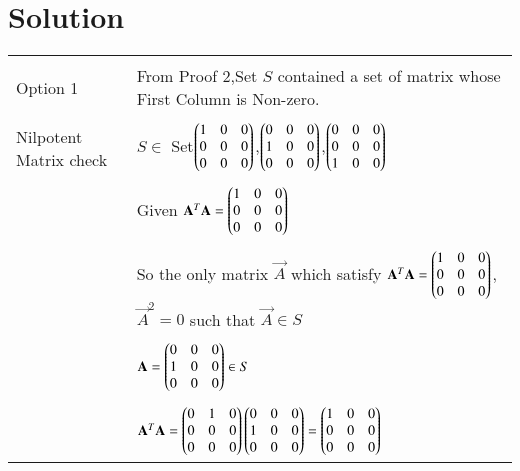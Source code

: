 \documentclass[journal,12pt]{IEEEtran}
\begin{document}
\section{\textbf{Solution}}
\renewcommand{\thetable}{2}
\begin{longtable}{|l|l|}
	\hline
	\multirow{3}{*}{Option 1} & \\
	&From Proof 2,Set $S$ contained a set of matrix whose First Column is Non-zero. \\ 
    & \\
    Nilpotent Matrix check&$S\in$ Set$\begin{pmatrix}1&0&0\\0&0&0\\0&0&0\end{pmatrix}$,$\begin{pmatrix}0&0&0\\1&0&0\\0&0&0\end{pmatrix}$,$\begin{pmatrix}0&0&0\\0&0&0\\1&0&0\end{pmatrix}$\\
    &\\
    &Given $\mathbf{A}^T\mathbf{A}=\begin{pmatrix}1&0&0\\0&0&0\\0&0&0\end{pmatrix}$\\
    &\\
    &So the only matrix $\vec{A}$ which satisfy $\mathbf{A}^T\mathbf{A}=\begin{pmatrix}1&0&0\\0&0&0\\0&0&0\end{pmatrix}$, $\vec{A}^2=0$ such that $\vec{A}\in S$\\
    &\\
    &$\mathbf{A}=\begin{pmatrix}0&0&0\\1&0&0\\0&0&0\end{pmatrix}\in S$\\
    &\\
    &$\mathbf{A}^T\mathbf{A}=\begin{pmatrix}0&1&0\\0&0&0\\0&0&0\end{pmatrix}\begin{pmatrix}0&0&0\\1&0&0\\0&0&0\end{pmatrix}=\begin{pmatrix}1&0&0\\0&0&0\\0&0&0\end{pmatrix}$\\
    

\end{longtable}
\end{document}
